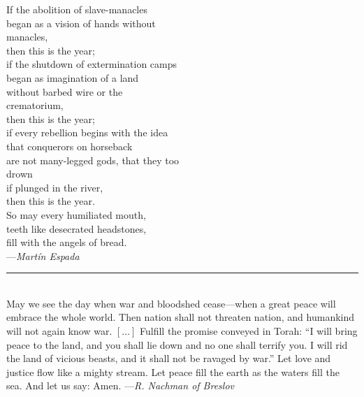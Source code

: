 \documentclass[a4paper,10pt,openany]{memoir}
\newcommand{\HgEllipsis}{\ensuremath{\left[\ldots\right]}}
\newcommand{\HgSource}[1]{\hfill{\small---\itshape{#1}}}
\newcommand{\HgFill}{\vfill \hrule \vfill}
\newenvironment{HgEnglish}{\strut\\\noindent}{\vspace{1em}}
\begin{document}
\begin{multicols}{2}
\noindent
If the abolition of slave-manacles \\
began as a vision of hands without \\
\vin manacles, \\
then this is the year; \\
if the shutdown of extermination camps \\
began as imagination of a land \\
without barbed wire or the \\
\vin crematorium, \\
then this is the year; \\
if every rebellion begins with the idea \\
that conquerors on horseback \\
are not many-legged gods, that they too \\
\vin drown \\
if plunged in the river, \\
then this is the year. \\
 
\noindent
So may every humiliated mouth, \\
teeth like desecrated headstones, \\
fill with the angels of bread.\\

\HgSource{Mart\'in Espada}
\end{multicols}

\HgFill

\begin{HgEnglish}
  \small
May we see the day when war and bloodshed cease---when a great peace will
embrace the whole world.  Then nation shall not threaten nation, and humankind
will not again know war. \HgEllipsis{}
Fulfill the promise conveyed in Torah: ``I will bring peace to the
land, and you shall lie down and no one shall terrify you.  I will rid the land
of vicious beasts, and it shall not be ravaged by war.'' Let love and justice
flow like a mighty stream.  Let peace fill the earth as the waters fill the sea.
And let us say: Amen. \HgSource{R. Nachman of Breslov}
\end{HgEnglish}
\end{document}
